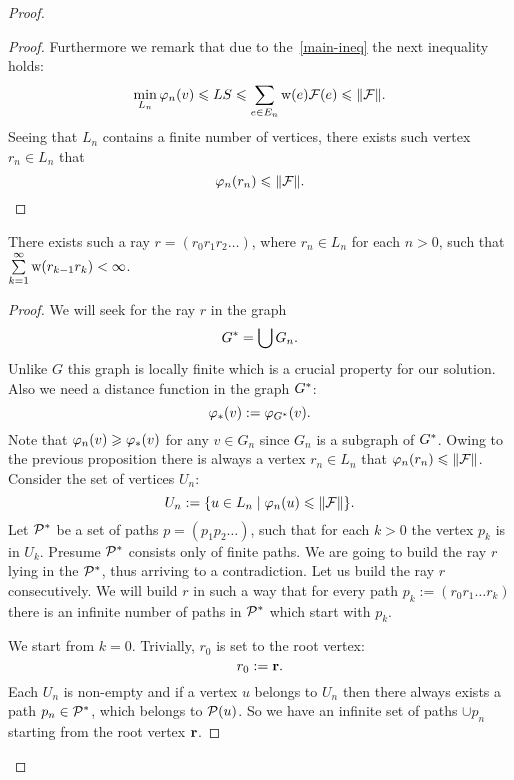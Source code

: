 \documentclass[12pt]{article}
\begin{document}
\begin{proof}
\begin{proof}
        Furthermore we remark that due to the~\eqref{main-ineq} the next inequality holds:
        \[
          \min_{L_n} \phi_n(v) \leq LS \leq \sum_{e \in E_n} \wtp(e) \flowpos(e) \leq \|\flowpos\|.
        \]
        Seeing that $L_n$ contains a finite number of vertices, there exists such vertex $r_n \in L_n$ that
        \[
          \phi_n(r_n) \leq \|\flowpos\|.
        \]
      \end{proof}
      \begin{prop}
        There exists such a ray $r=(r_0 r_1 r_2\dots)$, where $r_n \in L_n$ for each $n > 0$, such that $\sum\limits_{k=1}^\infty \wtp(r_{k-1}r_k) < \infty$.
      \end{prop}
      \begin{proof}
        We will seek for the ray $r$ in the graph
        \[
          \gstar = \bigcup G_n.
        \]
        Unlike $G$ this graph is locally finite which is a crucial property for our solution.
        Also we need a distance function in the graph $\gstar$:
        \[
          \phistar(v):=\phi_{\gstar}(v).
        \]
        Note that $\phi_n(v) \geq \phistar(v)$ for any $v \in G_n$ since $G_n$ is a subgraph of $\gstar$.
        Owing to the previous proposition there is always a vertex $r_n \in L_n$ that $\phi_n(r_n) \leq \|\flowpos\|$.
        Consider the set of vertices $U_n$:
        \[
          U_n:= \{u \in L_n \mid \phi_n(u) \leq \|\flowpos\|\}.
        \]
        Let $\cal{P}^*$ be a set of paths $p = (p_1 p_2 \dots)$, such that for each $k > 0$ the vertex $p_k$ is in $U_k$.
        Presume $\cal{P}^*$ consists only of finite paths.
        We are going to build the ray $r$ lying in the $\cal{P}^*$, thus arriving to a contradiction.
        Let us build the ray $r$ consecutively.
        We will build $r$ in such a way that for every path $p_k:= (r_0 r_1 \dots r_k)$ there is an infinite number of paths
          in $\cal{P}^*$ which start with $p_k$.

        We start from $k = 0$.
        Trivially, $r_0$ is set to the root vertex:
        \[
          r_0 := \root.
        \]
        Each $U_n$ is non-empty and if a vertex $u$ belongs to $U_n$ then there always exists
          a path $p_n \in \cal{P}^*$, which belongs to $\cal{P}(u)$.
        So we have an infinite set of paths $\cup p_n$ starting from the root vertex $\root$.


\end{proof}
\end{proof}
\end{document}
